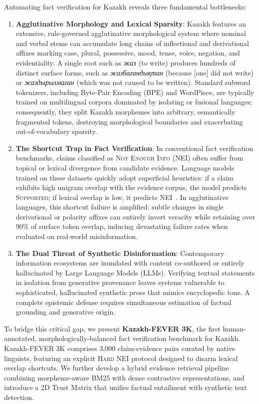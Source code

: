 Automating fact verification for Kazakh reveals three fundamental bottlenecks:
\begin{enumerate}
    \item \textbf{Agglutinative Morphology and Lexical Sparsity}: Kazakh features an extensive, rule-governed agglutinative morphological system where nominal and verbal stems can accumulate long chains of inflectional and derivational affixes marking case, plural, possessive, mood, tense, voice, negation, and evidentiality. A single root such as \textit{жаз} (to write) produces hundreds of distinct surface forms, such as \textit{жазбағандықтан} (because [one] did not write) or \textit{жаздырылмаған} (which was not caused to be written). Standard subword tokenizers, including Byte-Pair Encoding (BPE) and WordPiece, are typically trained on multilingual corpora dominated by isolating or fusional languages; consequently, they split Kazakh morphemes into arbitrary, semantically fragmented tokens, destroying morphological boundaries and exacerbating out-of-vocabulary sparsity.
    \item \textbf{The Shortcut Trap in Fact Verification}: In conventional fact verification benchmarks, claims classified as \textsc{Not Enough Info} (NEI) often suffer from topical or lexical divergence from candidate evidence. Language models trained on these datasets quickly adopt superficial heuristics: if a claim exhibits high unigram overlap with the evidence corpus, the model predicts \textsc{Supported}; if lexical overlap is low, it predicts \textsc{NEI}~\citep{yue-etal-2024-retrieval}. In agglutinative languages, this shortcut failure is amplified: subtle changes in single derivational or polarity affixes can entirely invert veracity while retaining over 90\% of surface token overlap, inducing devastating failure rates when evaluated on real-world misinformation.
    \item \textbf{The Dual Threat of Synthetic Disinformation}: Contemporary information ecosystems are inundated with content co-authored or entirely hallucinated by Large Language Models (LLMs). Verifying textual statements in isolation from generative provenance leaves systems vulnerable to sophisticated, hallucinated synthetic prose that mimics encyclopedic tone. A complete epistemic defense requires simultaneous estimation of factual grounding and generative origin.
\end{enumerate}

To bridge this critical gap, we present \textbf{Kazakh-FEVER 3K}, the first human-annotated, morphologically-balanced fact verification benchmark for Kazakh. Kazakh-FEVER 3K comprises 3,000 claim-evidence pairs curated by native linguists, featuring an explicit \textsc{Hard NEI} protocol designed to disarm lexical overlap shortcuts. We further develop a hybrid evidence retrieval pipeline combining morpheme-aware BM25 with dense contrastive representations, and introduce a 2D Trust Matrix that unifies factual entailment with synthetic text detection.

